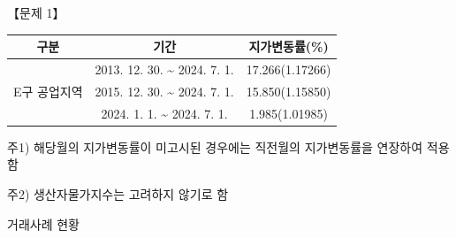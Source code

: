 \begin{longquestion}{【문제 1】}
{\small\centering
\begin{tabular}{|c|c|c|}
\hline
구분 & 기간 & 지가변동률(\%) \\
\hline
\multirow{3}{*}{E구 공업지역} & 2013. 12. 30. \textasciitilde{} 2024. 7. 1. & 17.266(1.17266) \\
\cline{2-3}
 & 2015. 12. 30. \textasciitilde{} 2024. 7. 1. & 15.850(1.15850) \\
\cline{2-3}
 & 2024. 1. 1. \textasciitilde{} 2024. 7. 1. & 1.985(1.01985) \\
\hline
\end{tabular}\par}

주1) 해당월의 지가변동률이 미고시된 경우에는 직전월의 지가변동률을 연장하여 적용함 \par
주2) 생산자물가지수는 고려하지 않기로 함 \par
\medskip{} 거래사례 현황 \par
{\small\centering
{}\par}


\end{longquestion}
